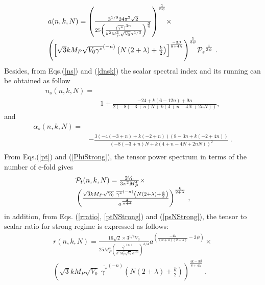 \documentclass[12pt]{revtex4}
\begin{document}
 \begin{equation}
\begin{array}{l}\label{a-Strong}
 a(n,k,N) = {\left( {\frac{{{3^{1/8}}24{\pi ^2}\sqrt 2 }}{{25{{\left( {\frac{{{{(\overline {{\gamma ^*}} )}^{3n}}}}{{{k^2}M_P^3\sqrt {{V_0}} {\alpha ^{1/3}}}}} \right)}^{\frac{3}{4}}}}}} \right)^{\frac{1}{{3\psi }}}} \times\\
  {\left( {{{\left[ {\sqrt 3 k{M_P}\sqrt {{V_0}} {{\overline {{\gamma ^*}} }^{( - n)}}\left( {N\left( {2 + \lambda } \right) + \frac{k}{2}} \right)} \right]}^{\frac{{ - 3\beta }}{{8 + 4\lambda }}}}} \right)^{\frac{1}{{3\psi }}}}{{{\cal P}_s}}^{\frac{1}{{3\psi }}}~.
  \end{array}
\end{equation}
Besides, from Eqs.(\ref{ns}) and (\ref{dnsk}) the scalar spectral index and its running can be obtained as follow
\begin{eqnarray}\nonumber
n_s(n, k, N)=\\
&1 + \frac{{ - 24 + k\left( {6 - 12n} \right) + 9n}}{{2\left( { - 8\left( { - 3 + n} \right)N + k\left( {4 + n - 4N + 2nN} \right)} \right)}},\label{nsNStrong}
\end{eqnarray}
and
\begin{eqnarray}\label{dnsNStrong}\nonumber
\alpha _s(n, k, N)=\\ \nonumber
&-\frac{{3\left( { - 4\left( { - 3 + n} \right) + k\left( { - 2 + n} \right)} \right)\left( {8 - 3n + k\left( { - 2 + 4n} \right)} \right)}}{{{{\left( { - 8\left( { - 3 + n} \right)N + k\left( {4 + n - 4N + 2nN} \right)} \right)}^2}}}~.\\
\end{eqnarray}
From Eqs.(\ref{pt}) and (\ref{PhiStrong}), the tensor power spectrum in terms of the number of e-fold gives
\begin{eqnarray}\label{ptNStrong}
\begin{array}{l}
{{\cal P}_t}(n, k, N) =\frac{{2{V_0}}}{{3{\pi ^2}M_P^4}} \times \\
\,{\left( {\frac{{ {\sqrt 3 k{M_P}\sqrt {{V_0}}~ {{\overline {{\gamma ^*}} }^{( - n)}}\left( {N\left( {2 + \lambda } \right) + \frac{k}{2}} \right)}}}{{{a^{\frac{4}{{n + 4}}}}}}} \right)^{\frac{k}{{2 + \lambda }}}}~,
\end{array}
\end{eqnarray}
in addition, from Eqs. (\ref{rratio}, \ref{ptNStrong}) and (\ref{psNStrong}), the tensor to scalar ratio for strong regime is expressed as follows:
\begin{equation}
\begin{array}{l}
r(n, k, N) = \frac{{16\sqrt 2  \times {3^{1/8}}{V_0}}}{{25M_P^4{{\left( {\frac{{{{\overline {{\gamma ^*}} }^{(3n)}}}}{{{k^2}M_P^3\sqrt {{V_0}} {\alpha ^{1/3}}}}} \right)}^{3/4}}}}{a^{(\frac{{ - 4k}}{{(n + 4)(2 + \lambda )}} - 3\psi )}} \times \\
{\left( {\sqrt 3 k{M_P}\sqrt {{V_0}} ~{{\overline {{\gamma ^*}} }^{( - n)}}\left( {N\left( {2 + \lambda } \right) + \frac{k}{2}} \right)} \right)^{\frac{{4k - 3\beta }}{{8 + 4\lambda }}}}~.
 \end{array}\label{rNStrong}
\end{equation}
\end{document}
